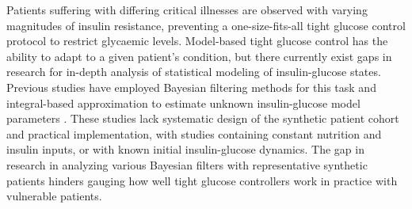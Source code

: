 \documentclass[nomenclature, english, bibtex]{kththesis}
\begin{document}

Patients suffering with differing critical illnesses are observed with varying magnitudes of insulin resistance, preventing a one-size-fits-all tight glucose control protocol to restrict glycaemic levels. Model-based tight glucose control has the ability to adapt to a given patient's condition, but there currently exist gaps in research for in-depth analysis of statistical modeling of insulin-glucose states. Previous studies have employed Bayesian filtering methods for this task \cite{aguirre-zapata_glycemic_2017} \cite{eberle_identifiability_2012} and integral-based approximation to estimate unknown insulin-glucose model parameters \cite{hann_integral-based_2005}. These studies lack systematic design of the synthetic patient cohort and practical implementation, with studies containing constant nutrition and insulin inputs, or with known initial insulin-glucose dynamics. The gap in research in analyzing various Bayesian filters with representative synthetic patients hinders gauging how well tight glucose controllers work in practice with vulnerable patients.


\end{document}

